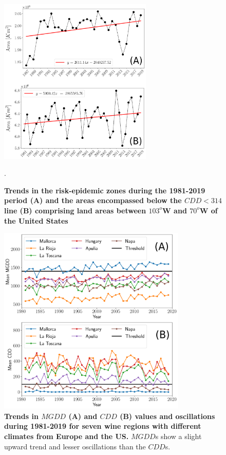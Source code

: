 \begin{figure}[H]
    \centering
    \includegraphics[width=0.65\textwidth]{Figures/CDD_risk_evol_USA.png}
    \caption{\textbf{Trends in the risk-epidemic zones during the 1981-2019
            period (A) and the areas encompassed below the $CDD < 314$ line (B)
            comprising
            land areas between $103^o$W and $70^o$W of the United States}}.
    \label{fig:sup_CDD_evol} %
\end{figure}

\begin{figure}[H]
    \centering
    \includegraphics[width=0.8\textwidth]{Figures/Mean_MGDD_CDD_sites.png}
    \caption{\textbf{Trends in $MGDD$ (A) and $CDD$ (B) values and
            oscillations during 1981-2019 for seven wine regions with different
            climates
            from Europe and the US.} $MGDD$s show a slight upward trend and
        lesser
        oscillations than the $CDD$s.}
    \label{fig:sup_climatic_oscilations} %
\end{figure}

